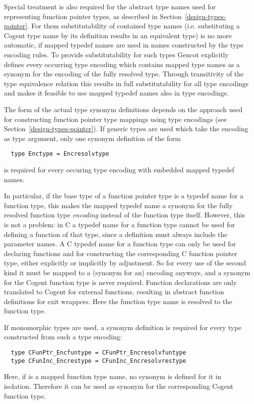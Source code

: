 Special treatment is also required for the abstract type names used for representing function pointer types, as
described in Section~\ref{design-types-pointer}. For them substitutability of contained type names (i.e. substituting
a Cogent type name by its definition results in an equivalent type) is no more automatic, if mapped typedef names 
are used in names constructed by the type encoding rules. To provide substitutability
for such types Gencot explicitly defines every occurring type encoding which contains mapped type names as a synonym for the
encoding of the fully resolved type. Through transitivity of the type equivalence relation this results in full
substitutability for all type encodings and makes it feasible to use mapped typedef names also in type encodings.

The form of the actual type synonym definitions depends on the approach used for constructing function pointer type 
mappings using type encodings (see Section~\ref{design-types-pointer}). If generic types are used which take the encoding
as type argument, only one synonym definition of the form 
\begin{verbatim}
  type Enctype = Encresolvtype
\end{verbatim}
is required for every occuring type encoding  with embedded mapped typedef names. 

In particular, if the base type of a function pointer type is a typedef name for a function type, this makes the mapped
typedef name  a synonym for the fully resolved function type \textit{encoding} instead of the function type itself.
However, this is not a problem: in C a typedef name for a function type cannot be used for defining a function of that type, 
since a definition must always include the parameter names. A C typedef name for a function type can only be used
for declaring functions and for constructing the corresponding C function pointer type, either explicitly or implicitly 
by adjustment. So for every use of the second kind it must be mapped to a (synonym for an) encoding anyways, and a synonym 
for the Cogent function type is never required. Function declarations are only translated to Cogent for external functions,
resulting in abstract function definitions for exit wrappers. Here the function type name is resolved to the function type.

If monomorphic types are
used, a synonym definition is required for every type constructed from such a type encoding:
\begin{verbatim}
  type CFunPtr_Encfuntype = CFunPtr_Encresolvfuntype
  type CFunInc_Encrestype = CFunInc_Encresolvrestype
\end{verbatim}
Here, if  is a mapped function type name, no synonym is defined for it in isolation. Therefore it can 
be used as synonym for the corresponding Cogent function type. 

